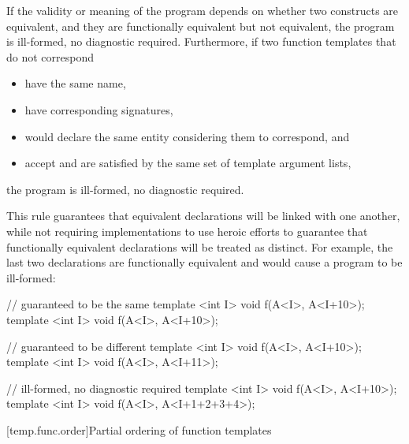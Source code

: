 \pnum
If the validity or meaning of the program depends on
whether two constructs are equivalent, and they are
functionally equivalent but not equivalent, the program is ill-formed,
no diagnostic required.
Furthermore, if two function templates that do not correspond
\begin{itemize}
\item have the same name,
\item have corresponding signatures,
\item would declare the same entity considering them to correspond, and
\item accept and are satisfied by the same set of template argument lists,
\end{itemize}
the program is ill-formed, no diagnostic required.

\pnum
\begin{note}
This rule guarantees that equivalent declarations will be linked with
one another, while not requiring implementations to use heroic efforts
to guarantee that functionally equivalent declarations will be treated
as distinct.
For example, the last two declarations are functionally
equivalent and would cause a program to be ill-formed:

\begin{codeblock}
// guaranteed to be the same
template <int I> void f(A<I>, A<I+10>);
template <int I> void f(A<I>, A<I+10>);

// guaranteed to be different
template <int I> void f(A<I>, A<I+10>);
template <int I> void f(A<I>, A<I+11>);

// ill-formed, no diagnostic required
template <int I> void f(A<I>, A<I+10>);
template <int I> void f(A<I>, A<I+1+2+3+4>);
\end{codeblock}
\end{note}

[temp.func.order]{Partial ordering of function templates}

